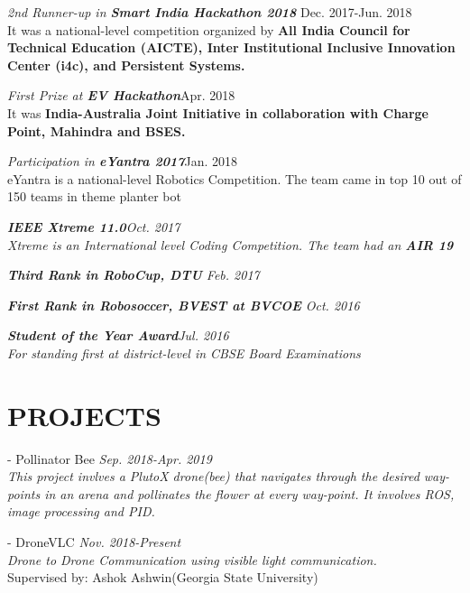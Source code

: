 \documentclass[margin, 10pt]{res} %
\begin{document}
\begin{resume}
{\sl 2nd Runner-up in \bf{Smart India Hackathon 2018} } \hfill Dec. 2017-Jun. 2018 \\ It was a national-level competition organized by \bf{All India Council for Technical Education (AICTE), Inter Institutional Inclusive Innovation Center (i4c),} and \bf{Persistent Systems}.

{\sl First Prize at  \bf{EV Hackathon}}\hfill {\normalfont Apr. 2018\\ It was } \bf{India-Australia Joint Initiative in collaboration with Charge Point, Mahindra and BSES.}

{\sl Participation in {\bf eYantra 2017}}\hfill {\normalfont Jan. 2018\\ eYantra is a national-level Robotics Competition. The team came in top 10 out of 150 teams in theme planter bot} 


{\sl {\bf IEEE Xtreme 11.0}\hfill{\normalfont Oct. 2017\\ Xtreme is an International level Coding Competition. The team had an {\bf AIR 19} }}

{\sl {\bf Third Rank in RoboCup, DTU}
\hfill {\normalfont Feb. 2017}}

{\sl {\bf First Rank in Robosoccer, BVEST at BVCOE}
\hfill{\normalfont Oct. 2016 }}

{\sl {\bf Student of the Year Award}\hfill{\normalfont Jul. 2016\\ For standing first at district-level in CBSE Board Examinations }}




\section{PROJECTS}

- {Pollinator Bee}
{\sl \hfill {\normalfont Sep. 2018-Apr. 2019}\\ This project invlves a PlutoX drone(bee) that navigates through the desired way-points in an arena and pollinates the flower at every way-point. It involves ROS, image processing and PID.}

- {DroneVLC}
{\sl \hfill {\normalfont Nov. 2018-Present}\\ Drone to Drone Communication using visible light communication.}\\Supervised by: Ashok Ashwin(Georgia State University)


\end{resume}
\end{document}
